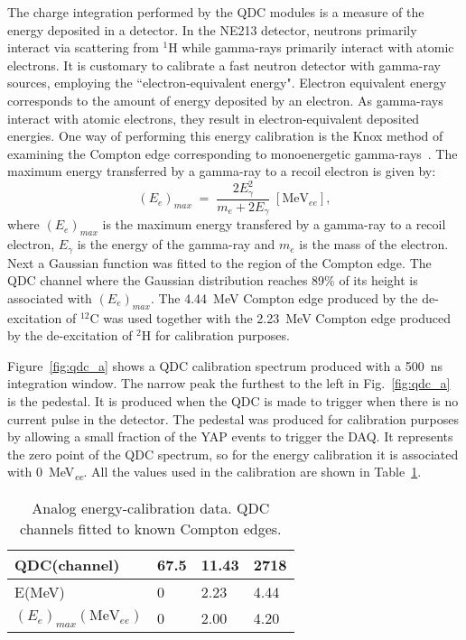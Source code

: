 \documentclass[main.tex]{subfiles}
\begin{document}
The charge integration performed by the QDC modules is a measure of the energy deposited in a detector. In the NE213 detector, neutrons primarily interact via scattering from $^1$H while gamma-rays primarily interact with atomic electrons. It is customary to calibrate a fast neutron detector with gamma-ray sources, employing the ``electron-equivalent energy". Electron equivalent energy corresponds to the amount of energy deposited by an electron. As gamma-rays interact with atomic electrons, they result in electron-equivalent deposited energies. One way of performing this energy calibration is the Knox method of examining the Compton edge corresponding to monoenergetic gamma-rays~\cite{Nilsson}. The maximum energy transferred by a gamma-ray to a recoil electron is given by:
\begin{equation}
	(E_{e})_{max}\;=\;\frac{2E_{\gamma}^2}{m_e + 2E_\gamma} \;[\textrm{MeV}_{ee}],
\end{equation}
where $(E_e)_{max}$ is the maximum energy transfered by a gamma-ray to a recoil electron, $E_\gamma$ is the energy of the gamma-ray and $m_e$ is the mass of the electron.
Next a Gaussian function was fitted to the region of the Compton edge. The QDC channel where the Gaussian distribution reaches 89\% of its height is associated with $(E_e)_{max}$. The \SI{4.44}{MeV} Compton edge produced by the de-excitation of $^{12}$C was used together with the \SI{2.23}{MeV} Compton edge produced by the de-excitation of $^2$H for calibration purposes.

Figure~\ref{fig:qdc_a} shows a QDC calibration spectrum produced with a \SI{500}{ns} integration window. The narrow peak the furthest to the left in Fig.~\ref{fig:qdc_a} is the pedestal. It is produced when the QDC is made to trigger when there is no current pulse in the detector. The pedestal was produced for calibration purposes by allowing a small fraction of the YAP events to trigger the DAQ. It represents the zero point of the QDC spectrum, so for the energy calibration it is associated with \SI{0}{MeV_{\textit{ee}}}. All the values used in the calibration are shown in Table~\ref{tab:knox_a}.

\begin{table}[hb]
	\center
	\begin{tabular}{|l|l|l|l|}
	\hline
	QDC(channel)             & 67.5 & 11.43 & 2718 \\
	\hline
	E(MeV)          & 0    & 2.23  & 4.44 \\
	\hline
	$(E_{e})_{max}(\textrm{MeV}_{ee})$ & 0    & 2.00  & 4.20 \\
	\hline
	\end{tabular}
   	\captionsetup{width=0.435\linewidth}
	\caption[Analog energy-calibration data.]{Analog energy-calibration data. QDC channels fitted to known Compton edges.}
	\label{tab:knox_a}
\end{table}
\end{document}
